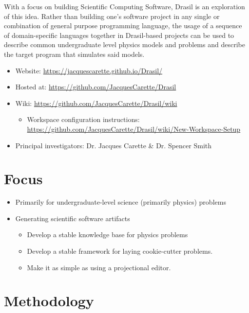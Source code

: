 
With a focus on building Scientific Computing Software, Drasil is an
exploration of this idea. Rather than building one's software project in any
single or combination of general purpose programming language, the usage of a
sequence of domain-specific languages together in Drasil-based projects can be
used to describe common undergraduate level physics models and problems and
describe the target program that simulates said models.

\begin{itemize}
    \item Website: \url{https://jacquescarette.github.io/Drasil/}
    \item Hosted at: \url{https://github.com/JacquesCarette/Drasil}
    \item Wiki: \url{https://github.com/JacquesCarette/Drasil/wiki}
        \begin{itemize}
            \item Workspace configuration instructions: \url{https://github.com/JacquesCarette/Drasil/wiki/New-Workspace-Setup}
        \end{itemize}
    \item Principal investigators: Dr. Jacques Carette \& Dr. Spencer Smith
\end{itemize}

\section{Focus}

\begin{itemize}
    \item Primarily for undergraduate-level science (primarily physics) problems
    \item Generating scientific software artifacts
        \begin{itemize}
            \item Develop a stable knowledge base for physics problems
            \item Develop a stable framework for laying cookie-cutter problems.
            \item Make it as simple as using a projectional editor.
        \end{itemize}
\end{itemize}

\section{Methodology}

